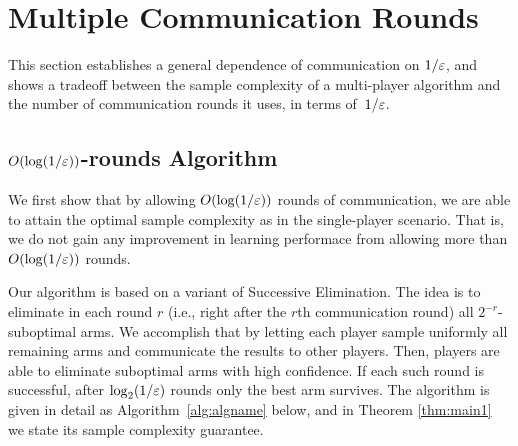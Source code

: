 
\section{Multiple Communication Rounds}
\label{sec:multiplerounds}


This section establishes a general dependence of communication on
$1/\varepsilon$, and shows a tradeoff between the sample complexity of a multi-player
algorithm and the number of communication rounds it uses, in terms of~$1/\varepsilon$.



\subsection{$O(\log(1/\varepsilon))$-rounds Algorithm}

We first show that by allowing $O(\log(1/\varepsilon))$ rounds of communication, we are able to attain the optimal sample complexity as in the single-player scenario.
That is, we do not gain any improvement in learning performace from allowing more than $O(\log(1/\varepsilon))$ rounds.

Our algorithm is based on a variant of Successive Elimination. The idea is to eliminate in each round $r$ (i.e., right after the $r$th communication round) all $2^{-r}$-suboptimal arms.
We accomplish that by letting each player sample uniformly all remaining arms and communicate the results to other players. Then, players are able to eliminate suboptimal arms with high confidence.
If each such round is successful, after $\log_2(1/\varepsilon)$ rounds only the best arm survives.
The algorithm is given in detail as Algorithm~\ref{alg:algname} below, and in Theorem \ref{thm:main1} we state its sample complexity guarantee.


